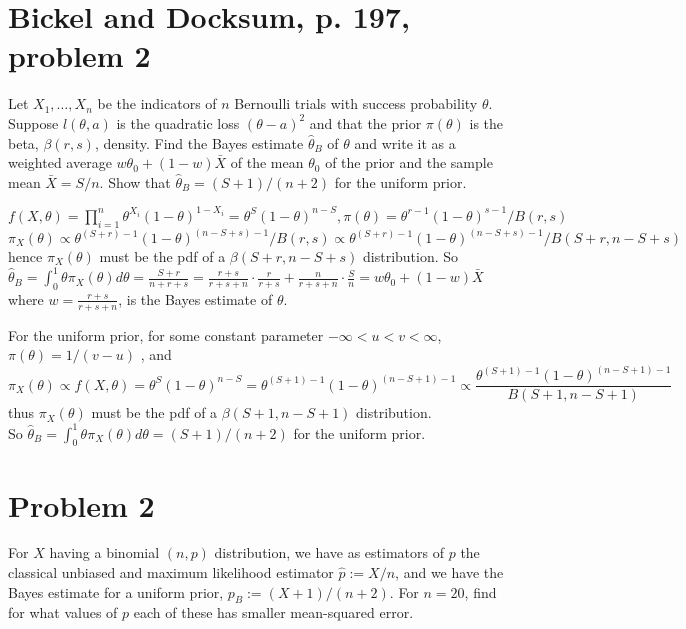 \documentclass[11pt]{article}
\newcommand{\ProbS}{\iftrue}
\newcommand{\ProbE}{\fi}
\begin{document}
\section{Bickel and Docksum, p. 197, problem 2}
\ProbS
Let $X_1, \dots, X_n$ be the indicators of $n$ Bernoulli trials with success probability $\theta$. Suppose $l(\theta, a)$ is the quadratic loss $(\theta-a)^2$ and that the prior $\pi(\theta)$ is the beta,
$\beta(r, s)$, density. Find the Bayes estimate $\hat{\theta}_B$ of
$\theta$ and write it as a weighted average $w\theta_0 + (1-w)\bar{X}$ of the mean $\theta_0$ of the prior and the sample mean $\bar{X} = S/n$. Show that $\hat{\theta}_B = (S+1)/(n+2)$ for the uniform prior.
\ProbE

$
f(X, \theta) = \prod_{i=1}^{n} \theta^{X_i} (1-\theta)^{1-X_i}
= \theta^{S} (1-\theta)^{n-S},
\pi(\theta) = \theta^{r-1} (1-\theta)^{s-1} / B(r,s)
$
\\
$
\pi_X(\theta) \propto
{\theta^{(S+r)-1}(1-\theta)^{(n-S+s)-1}} / {B(r, s)} \propto
{\theta^{(S+r)-1}(1-\theta)^{(n-S+s)-1}} / {B(S+r, n-S+s)}
$
\\
hence $\pi_X(\theta)$ must be the pdf of a
$\beta(S+r, n-S+s)$ distribution. So
$
\hat{\theta}_B =
\int_{0}^{1} \theta \pi_X(\theta) d\theta
= \frac{S+r}{n+r+s}
= \frac{r+s}{r+s+n} \cdot \frac{r}{r+s} +
  \frac{n}{r+s+n} \cdot \frac{S}{n}
= w \theta_0 + (1-w) \bar{X}
$
\\
where $w = \frac{r+s}{r+s+n}$,
is the Bayes estimate of $\theta$.

For the uniform prior, for some constant parameter
$-\infty < u<v < \infty$,
$
\pi(\theta) = 1/(v-u)
$
, and
$$
\pi_X(\theta) \propto
f(X, \theta) =
\theta^{S} (1-\theta)^{n-S}
=
\theta^{(S+1)-1} (1-\theta)^{(n-S+1)-1} \propto
\frac{\theta^{(S+1)-1} (1-\theta)^{(n-S+1)-1}}{B(S+1, n-S+1)}
$$
thus $\pi_X(\theta)$ must be the pdf of a
$\beta(S+1, n-S+1)$ distribution.\\
So
$
\hat{\theta}_B =
\int_{0}^{1} \theta \pi_X(\theta) d\theta
= (S+1)/(n+2)
$
for the uniform prior.

\section{Problem 2}
\ProbS
For $X$ having a binomial $(n,p)$ distribution, we have as estimators of $p$ the classical unbiased and maximum likelihood estimator
$
\hat{p} := X/n
$, and we have the Bayes estimate for a uniform prior,
$
p_B := (X+1)/(n+2)
$. For $n=20$, find for what values of $p$ each of these has smaller mean-squared error.
\ProbE
\end{document}
